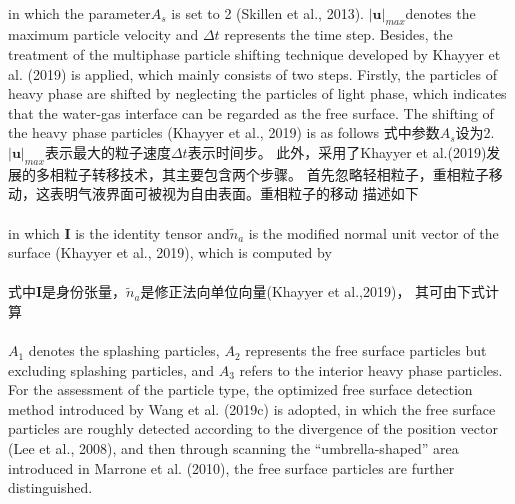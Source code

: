 \documentclass[UTF8]{ctexart}
\begin{document}
{{\paragraph{\quad}in which the parameter$ A_s$ is set to 2 (Skillen et al., 2013). 
                $|\mathbf{u}|_{max} $denotes the maximum particle velocity and $\Delta t$ represents 
                the time step. Besides, the treatment of the multiphase particle 
                shifting technique developed by Khayyer et al. (2019) is applied, 
                which mainly consists of two steps. Firstly, the particles of 
                heavy phase are shifted by neglecting the particles of light phase, 
                which indicates that the water-gas interface can be regarded as the 
                free surface. The shifting of the heavy phase particles (Khayyer et al., 2019) 
                is as follows
\paragrap{\quad}式中参数$A_s$设为2.$|\mathbf{u}|_{max}$表示最大的粒子速度$\Delta t$表示时间步。
                此外，采用了Khayyer et al.(2019)发展的多相粒子转移技术，其主要包含两个步骤。
                首先忽略轻相粒子，重相粒子移动，这表明气液界面可被视为自由表面。重相粒子的移动
                描述如下


\paragraph{\quad}in which $\mathbf{I}$ is the identity tensor and$\tilde{n}_a$ is the modified normal 
                unit vector of the surface (Khayyer et al., 2019), which is computed by
\paragraph{\quad}式中$\mathbf{I}$是身份张量，$\tilde{n}_a$是修正法向单位向量(Khayyer et al.,2019)，
                其可由下式计算
            

\paragraph{\quad}$A_1$ denotes the splashing particles, $A_2$ represents the free surface particles 
                but excluding splashing particles, and $A_3$ refers to the interior heavy phase 
                particles. For the assessment of the particle type, the optimized free surface 
                detection method introduced by Wang et al. (2019c) is adopted, in which the free 
                surface particles are roughly detected according to the divergence of the position 
                vector (Lee et al., 2008), and then through scanning the “umbrella-shaped” area 
                introduced in Marrone et al. (2010), the free surface particles are further distinguished.
}}
\end{document}
